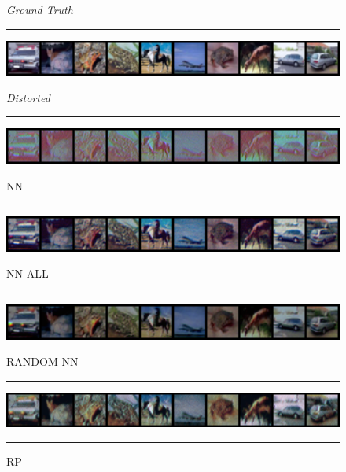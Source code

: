 \begin{figure}[h]
    \centering
    \setlength{\abovecaptionskip}{0pt plus 0pt minus 0pt}
    \setlength{\belowcaptionskip}{10pt plus 0pt minus 0pt}
    \caption*{\normalsize{\textit{Ground Truth}}}
    \rule{0.4\textwidth}{.4pt}
    
    \centerline{\hspace*{8mm}\includegraphics[width=1.4\textwidth]{figures/unsupervised/reconstruction_CIFAR10_ground_truth.png}}
    \caption*{\normalsize{\textit{Distorted}}}
    \rule{0.4\textwidth}{.4pt}
    
    \centerline{\hspace*{8mm}\includegraphics[width=1.4\textwidth]{figures/unsupervised/reconstruction_CIFAR10_distorted.png}}
    
    \caption*{\normalsize{NN}}
    \rule{0.4\textwidth}{.4pt}
    
    \centerline{\hspace*{8mm}\includegraphics[width=1.4\textwidth]{figures/unsupervised/reconstruction_CIFAR10_NN_epoch_100.png}}
    \caption*{\normalsize{NN ALL}}
    \rule{0.4\textwidth}{.4pt}
    
    \centerline{\hspace*{8mm}\includegraphics[width=1.4\textwidth]{figures/unsupervised/reconstruction_CIFAR10_NN_ALL_epoch_100.png}}
    
    \caption*{\normalsize{RANDOM NN}}
    \rule{0.4\textwidth}{.4pt}
    
    \centerline{\hspace*{8mm}\includegraphics[width=1.4\textwidth]{figures/unsupervised/reconstruction_CIFAR10_RANDOM_NN_epoch_100.png}}
    \caption*{\normalsize{RP}}
    \rule{0.4\textwidth}{.4pt}
    

\end{figure}
